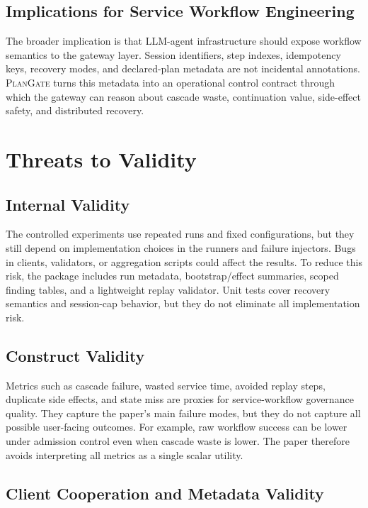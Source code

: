\documentclass[5p,times]{elsarticle}
\newcommand{\plangate}{\textsc{PlanGate}\xspace}
\begin{document}
\subsection{Implications for Service Workflow Engineering}

The broader implication is that LLM-agent infrastructure should expose workflow semantics to the gateway layer. Session identifiers, step indexes, idempotency keys, recovery modes, and declared-plan metadata are not incidental annotations. \plangate turns this metadata into an operational control contract through which the gateway can reason about cascade waste, continuation value, side-effect safety, and distributed recovery.

\section{Threats to Validity}
\label{sec:threats}

\subsection{Internal Validity}

The controlled experiments use repeated runs and fixed configurations, but they still depend on implementation choices in the runners and failure injectors. Bugs in clients, validators, or aggregation scripts could affect the results. To reduce this risk, the package includes run metadata, bootstrap/effect summaries, scoped finding tables, and a lightweight replay validator. Unit tests cover recovery semantics and session-cap behavior, but they do not eliminate all implementation risk.

\subsection{Construct Validity}

Metrics such as cascade failure, wasted service time, avoided replay steps, duplicate side effects, and state miss are proxies for service-workflow governance quality. They capture the paper's main failure modes, but they do not capture all possible user-facing outcomes. For example, raw workflow success can be lower under admission control even when cascade waste is lower. The paper therefore avoids interpreting all metrics as a single scalar utility.

\subsection{Client Cooperation and Metadata Validity}
\end{document}
